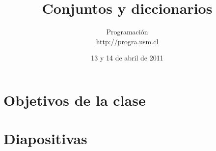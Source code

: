\documentclass[10pt]{article}
\title{Conjuntos y diccionarios}
\author{Programación \\ \url{http://progra.usm.cl}}
\date{13 y 14 de abril de 2011}
\begin{document}
  \maketitle

  \section*{Objetivos de la clase}

  \section*{Diapositivas}
\end{document}
